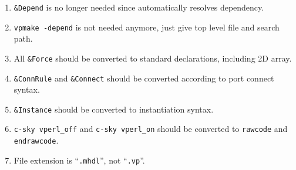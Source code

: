 \begin{enumerate}
\item \texttt{\&Depend} is no longer needed since \mhdlc{} automatically 
resolves dependency. 

\item \texttt{vpmake -depend} is not needed anymore, just give \mhdlc{} top level file and search path.

\item All \texttt{\&Force} should be converted to standard \vlog{} declarations, 
including 2D array. 

\item \texttt{\&ConnRule} and \texttt{\&Connect} should be converted according to 
\mhdl{} port connect syntax. 

\item \texttt{\&Instance} should be converted to \mhdl{} instantiation syntax.

\item \texttt{c-sky vperl\_off} and \texttt{c-sky vperl\_on} should be converted
to \texttt{rawcode} and \texttt{endrawcode}.

\item File extension is ``\texttt{.mhdl}'', not ``\texttt{.vp}''.
\end{enumerate}
